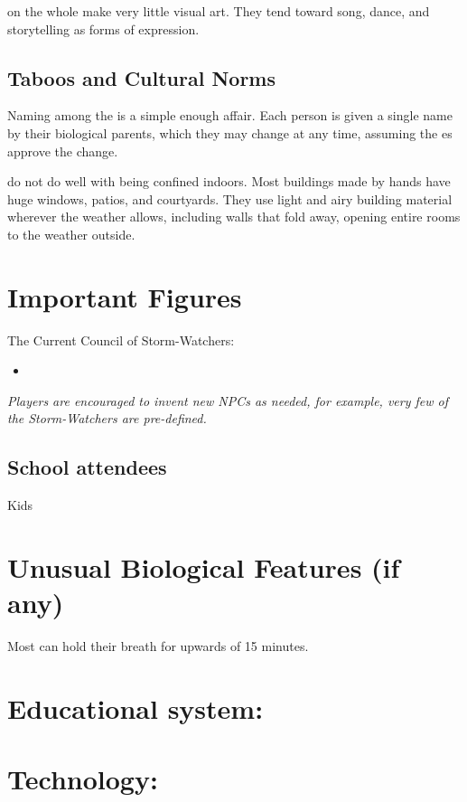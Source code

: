 \documentclass[blue]{GL2020}
\begin{document}
\pShippies{} on the whole make very little visual art. They tend toward song, dance, and storytelling as forms of expression.

\subsection*{Taboos and Cultural Norms}
Naming among the \pShip{} is a simple enough affair. Each person is given a single name by their biological parents, which they may change at any time, assuming the \cEbb{\God}es approve the change.

\pShippies{} do not do well with being confined indoors. Most buildings made by \pShip{} hands have huge windows, patios, and courtyards. They use light and airy building material wherever the weather allows, including walls that fold away, opening entire rooms to the weather outside.

\section*{Important Figures}
The Current Council of Storm-Watchers:
\begin{itemize}
	\item \cLoud{}
\end{itemize}

\emph{Players are encouraged to invent new NPCs as needed, for example, very few of the Storm-Watchers are pre-defined.}

\subsection*{School attendees}

Kids




\section*{Unusual Biological Features (if any)}
Most \pShippies{} can hold their breath for upwards of 15 minutes.

\section{Educational system:}

\section{Technology:}
\end{document}
